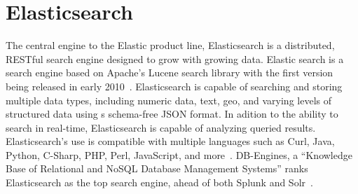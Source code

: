 \section{Elasticsearch}

The central engine to the Elastic product line, Elasticsearch is a
distributed, RESTful search engine designed to grow with growing
data. Elastic search is a search engine based on Apache's Lucene
search library with the first version being released in early
2010~\cite{hid-sp18-507-ElasticWiki}. Elasticsearch is capable of
searching and storing multiple data types, including numeric data,
text, geo, and varying levels of structured data using s schema-free
JSON format. In adition to the ability to search in real-time,
Elasticsearch is capable of analyzing queried results. Elasticsearch's
use is compatible with multiple languages such as Curl, Java, Python,
C-Sharp, PHP, Perl, JavaScript, and
more~\cite{hid-sp18-507-Elasticsearch}. DB-Engines, a ``Knowledge Base
of Relational and NoSQL Database Management Systems'' ranks
Elasticsearch as the top search engine, ahead of both Splunk and
Solr~\cite{hid-sp18-507-DBEngines}.
